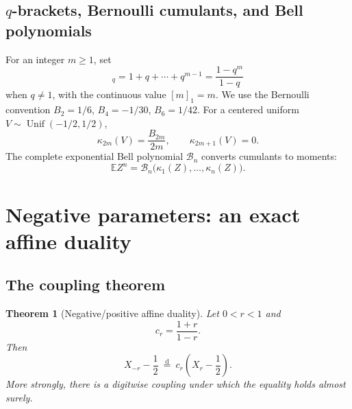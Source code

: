\documentclass[11pt]{article}
\newtheorem{theorem}{Theorem}[section]
\theoremstyle{definition}
\newcommand{\E}{\mathbb E}
\newcommand{\cump}{\kappa}
\newcommand{\doteqL}{\mathrel{\stackrel{\mathrm d}=}}
\begin{document}
\subsection{$q$-brackets, Bernoulli cumulants, and Bell polynomials}

For an integer \(m\ge1\), set
\begin{equation}
 [m]_q=1+q+\cdots+q^{m-1}=\frac{1-q^m}{1-q}             \label{eq:q-bracket}
\end{equation}
when \(q\ne1\), with the continuous value \([m]_1=m\).  We use the Bernoulli convention
\(B_2=1/6\), \(B_4=-1/30\), \(B_6=1/42\).  For a centered uniform
\(V\sim\operatorname{Unif}(-1/2,1/2)\),
\begin{equation}
 \cump_{2m}(V)=\frac{B_{2m}}{2m},
 \qquad
 \cump_{2m+1}(V)=0.                                    \label{eq:uniform-cumulants}
\end{equation}
The complete exponential Bell polynomial \(\mathcal B_n\) converts cumulants to moments:
\begin{equation}
 \E Z^n=\mathcal B_n\bigl(\cump_1(Z),\ldots,\cump_n(Z)\bigr). \label{eq:bell-moment}
\end{equation}

\section{Negative parameters: an exact affine duality}

\subsection{The coupling theorem}

\begin{theorem}[Negative/positive affine duality]\label{thm:negative-duality}
Let \(0<r<1\) and
\begin{equation}
 c_r=\frac{1+r}{1-r}.                                    \label{eq:cr-def}
\end{equation}
Then
\begin{equation}
 \boxed{
 X_{-r}-\frac12\ \doteqL\ c_r\left(X_r-\frac12\right).}
                                                               \label{eq:negative-duality}
\end{equation}
More strongly, there is a digitwise coupling under which the equality holds almost
surely.
\end{theorem}
\end{document}
